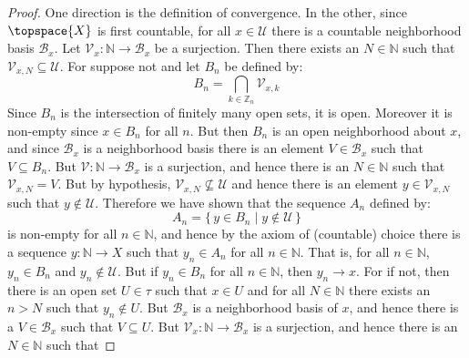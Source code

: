 \documentclass{article}                                                        %
\begin{document}
        \begin{proof}
            One direction is the definition of convergence. In the other, since
            $\topspace{X}$ is first countable, for all $x\in\mathcal{U}$ there
            is a countable neighborhood basis $\mathcal{B}_{x}$. Let
            $\mathcal{V}_{x}:\mathbb{N}\rightarrow\mathcal{B}_{x}$ be a
            surjection. Then there exists an $N\in\mathbb{N}$ such that
            $\mathcal{V}_{x,N}\subseteq\mathcal{U}$. For suppose not and let
            $B_{n}$ be defined by:
            \begin{equation}
                B_{n}=\bigcap_{k\in\mathbb{Z}_{n}}\mathcal{V}_{x,k}
            \end{equation}
            Since $B_{n}$ is the intersection of finitely many open sets, it is
            open. Moreover it is non-empty since $x\in{B}_{n}$ for all $n$.
            But then $B_{n}$ is an open neighborhood about $x$, and since
            $\mathcal{B}_{x}$ is a neighborhood basis there is an element
            $V\in\mathcal{B}_{x}$ such that $V\subseteq{B}_{n}$. But
            $\mathcal{V}:\mathbb{N}\rightarrow\mathcal{B}_{x}$ is a surjection,
            and hence there is an $N\in\mathbb{N}$ such that
            $\mathcal{V}_{x,N}=V$. But by hypothesis,
            $\mathcal{V}_{x,N}\nsubseteq\mathcal{U}$ and hence there is an
            element $y\in\mathcal{V}_{x,N}$ such that $y\notin\mathcal{U}$.
            Therefore we have shown that the sequence $A_{n}$ defined by:
            \begin{equation}
                A_{n}=\{\,y\in{B}_{n}\;|\;y\not\in\mathcal{U}\,\}
            \end{equation}
            is non-empty for all $n\in\mathbb{N}$, and hence by the axiom of
            (countable) choice there is a sequence $y:\mathbb{N}\rightarrow{X}$
            such that $y_{n}\in{A}_{n}$ for all $n\in\mathbb{N}$. That is,
            for all $n\in\mathbb{N}$, $y_{n}\in{B}_{n}$ and
            $y_{n}\notin\mathcal{U}$. But if $y_{n}\in{B}_{n}$ for all
            $n\in\mathbb{N}$, then $y_{n}\rightarrow{x}$. For if not, then there
            is an open set $U\in\tau$ such that $x\in{U}$ and for all
            $N\in\mathbb{N}$ there exists an $n>N$ such that $y_{n}\notin{U}$.
            But $\mathcal{B}_{x}$ is a neighborhood basis of $x$, and hence
            there is a $V\in\mathcal{B}_{x}$ such that $V\subseteq{U}$. But
            $\mathcal{V}_{x}:\mathbb{N}\rightarrow\mathcal{B}_{x}$ is a
            surjection, and hence there is an $N\in\mathbb{N}$ such that

\end{proof}
\end{document}
